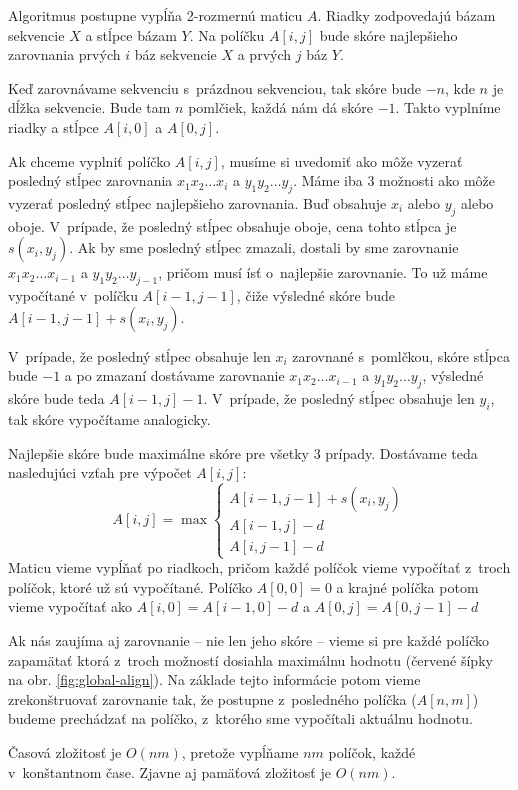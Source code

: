 Algoritmus postupne vypĺňa 2-rozmernú maticu $A$. Riadky zodpovedajú bázam sekvencie $X$ a stĺpce bázam $Y$. Na políčku $A[i,j]$ bude skóre najlepšieho zarovnania prvých $i$ báz sekvencie $X$ a prvých $j$ báz $Y$.

Keď zarovnávame sekvenciu s~prázdnou sekvenciou, tak skóre bude $-n$, kde $n$ je dĺžka sekvencie. Bude tam $n$ pomlčiek, každá nám dá skóre $-1$. Takto vyplníme riadky a stĺpce $A[i,0]$ a $A[0,j]$.

Ak chceme vyplniť políčko $A[i,j]$, musíme si uvedomiť ako môže vyzerať posledný stĺpec zarovnania $x_1x_2\dots x_i$ a $y_1y_2\dots y_j$. Máme iba 3 možnosti ako môže vyzerať posledný stĺpec najlepšieho zarovnania. Buď obsahuje $x_i$ alebo $y_j$ alebo oboje. V~prípade, že posledný stĺpec obsahuje oboje, cena tohto stĺpca je $s(x_i, y_j)$. Ak by sme posledný stĺpec zmazali, dostali by sme zarovnanie $x_1x_2\dots x_{i-1}$ a $y_1y_2\dots y_{j-1}$, pričom musí ísť o~najlepšie zarovnanie. To už máme vypočítané v~políčku $A[i-1, j-1]$, čiže výsledné skóre bude $A[i-1, j-1] + s(x_i,y_j)$.

V~prípade, že posledný stĺpec obsahuje len $x_i$ zarovnané s~pomlčkou, skóre stĺpca bude $-1$ a po zmazaní dostávame zarovnanie $x_1x_2\dots x_{i-1}$ a $y_1y_2\dots y_{j}$, výsledné skóre bude teda $A[i-1, j] -1$. V~prípade, že posledný stĺpec obsahuje len $y_i$, tak skóre vypočítame analogicky.

Najlepšie skóre bude maximálne skóre pre všetky 3 prípady.
Dostávame teda nasledujúci vzťah pre výpočet $A[i,j]$:
$$A[i,j] = \max \left\{
\begin{array}{l}
A[i-1,j-1]+s(x_i, y_j)\\
A[i-1,j]-d\\
A[i,j-1]-d
\end{array} \right.$$
Maticu vieme vypĺňať po riadkoch, pričom každé políčok vieme vypočítať z~troch políčok, ktoré už sú vypočítané. Políčko $A[0, 0] = 0$ a krajné políčka potom vieme vypočítať ako $A[i,0] = A[i-1,0]-d$ a $A[0, j] = A[0,j-1]-d$

Ak nás zaujíma aj zarovnanie -- nie len jeho skóre -- vieme si pre každé políčko zapamätať ktorá z~troch možností dosiahla maximálnu hodnotu
(červené šípky na obr. \ref{fig:global-align}). Na základe tejto informácie potom vieme zrekonštruovať zarovnanie tak, že postupne z~posledného políčka ($A[n,m]$) budeme prechádzať na políčko, z~ktorého sme vypočítali aktuálnu hodnotu.

Časová zložitosť je $O(nm)$, pretože vypĺňame $nm$ políčok, každé v~konštantnom čase. Zjavne aj pamäťová zložitosť je $O(nm)$.

